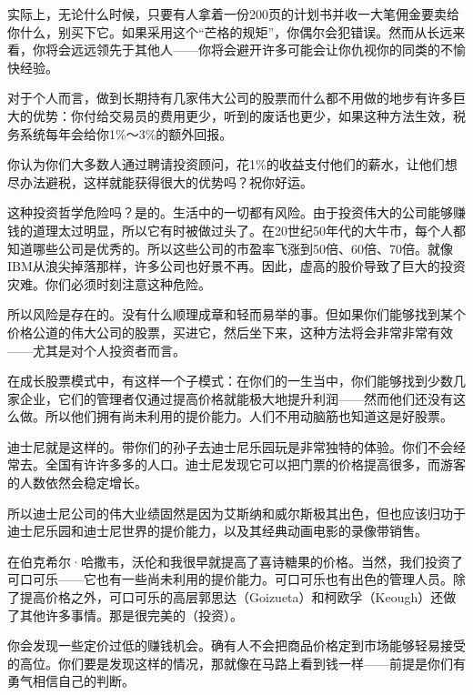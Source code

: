 实际上，无论什么时候，只要有人拿着一份200页的计划书并收一大笔佣金要卖给你什么，别买下它。如果采用这个“芒格的规矩”，你偶尔会犯错误。然而从长远来看，你将会远远领先于其他人——你将会避开许多可能会让你仇视你的同类的不愉快经验。
\par

对于个人而言，做到长期持有几家伟大公司的股票而什么都不用做的地步有许多巨大的优势：你付给交易员的费用更少，听到的废话也更少，如果这种方法生效，税务系统每年会给你1\%～3\%的额外回报。
\par

你认为你们大多数人通过聘请投资顾问，花1\%的收益支付他们的薪水，让他们想尽办法避税，这样就能获得很大的优势吗？祝你好运。
\par

这种投资哲学危险吗？是的。生活中的一切都有风险。由于投资伟大的公司能够赚钱的道理太过明显，所以它有时被做过头了。在20世纪50年代的大牛市，每个人都知道哪些公司是优秀的。所以这些公司的市盈率飞涨到50倍、60倍、70倍。就像IBM从浪尖掉落那样，许多公司也好景不再。因此，虚高的股价导致了巨大的投资灾难。你们必须时刻注意这种危险。
\par

所以风险是存在的。没有什么顺理成章和轻而易举的事。但如果你们能够找到某个价格公道的伟大公司的股票，买进它，然后坐下来，这种方法将会非常非常有效——尤其是对个人投资者而言。
\par

在成长股票模式中，有这样一个子模式：在你们的一生当中，你们能够找到少数几家企业，它们的管理者仅通过提高价格就能极大地提升利润——然而他们还没有这么做。所以他们拥有尚未利用的提价能力。人们不用动脑筋也知道这是好股票。
\par

迪士尼就是这样的。带你们的孙子去迪士尼乐园玩是非常独特的体验。你们不会经常去。全国有许许多多的人口。迪士尼发现它可以把门票的价格提高很多，而游客的人数依然会稳定增长。
\par

所以迪士尼公司的伟大业绩固然是因为艾斯纳和威尔斯极其出色，但也应该归功于迪士尼乐园和迪士尼世界的提价能力，以及其经典动画电影的录像带销售。
\par

在伯克希尔·哈撒韦，沃伦和我很早就提高了喜诗糖果的价格。当然，我们投资了可口可乐——它也有一些尚未利用的提价能力。可口可乐也有出色的管理人员。除了提高价格之外，可口可乐的高层郭思达（Goizueta）和柯欧孚（Keough）还做了其他许多事情。那是很完美的（投资）。
\par

你会发现一些定价过低的赚钱机会。确有人不会把商品价格定到市场能够轻易接受的高位。你们要是发现这样的情况，那就像在马路上看到钱一样——前提是你们有勇气相信自己的判断。
\par

